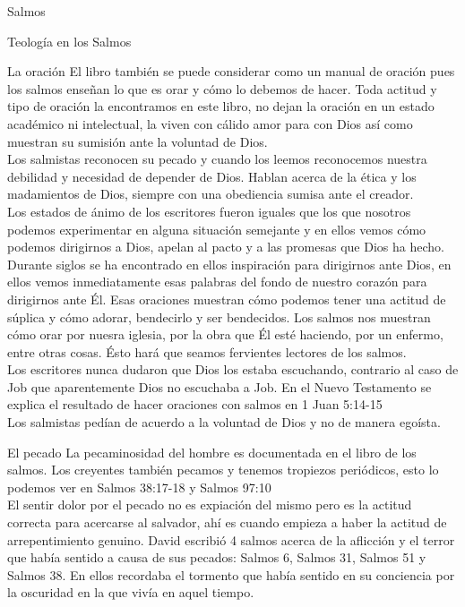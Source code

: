 \begin{section}{Salmos}
\begin{subsection}{Teología en los Salmos}
\begin{subsubsection}{La oración}
			El libro también se puede considerar como un manual de oración pues los salmos enseñan lo que es orar y cómo lo debemos de hacer. Toda actitud y tipo de oración la encontramos en este libro, no dejan la oración en un estado académico ni intelectual, la viven con cálido amor para con Dios así como muestran su sumisión ante la voluntad de Dios. \\
			Los salmistas reconocen su pecado y cuando los leemos reconocemos nuestra debilidad y necesidad de depender de Dios. Hablan acerca de la ética y los madamientos de Dios, siempre con una obediencia sumisa ante el creador.\\
			Los estados de ánimo de los escritores fueron iguales que los que nosotros podemos experimentar en alguna situación semejante y en ellos vemos cómo podemos dirigirnos a Dios, apelan al pacto y a las promesas que Dios ha hecho.\\
			Durante siglos se ha encontrado en ellos inspiración para dirigirnos ante Dios, en ellos vemos inmediatamente esas palabras del fondo de nuestro corazón para dirigirnos ante Él.
			\newpage
			Esas oraciones muestran cómo podemos tener una actitud de súplica y cómo adorar, bendecirlo y ser bendecidos. Los salmos nos muestran cómo orar por nuesra iglesia, por la obra que Él esté haciendo, por un enfermo, entre otras cosas. Ésto hará que seamos fervientes lectores de los salmos.\\
			Los escritores nunca dudaron que Dios los estaba escuchando, contrario al caso de Job que aparentemente Dios no escuchaba a Job. En el Nuevo Testamento se explica el resultado de hacer oraciones con salmos en  1 Juan 5:14-15\\
			Los salmistas pedían de acuerdo a la voluntad de Dios y no de manera egoísta.
		\end{subsubsection}
		\begin{subsubsection}{El pecado}
			La pecaminosidad del hombre es documentada en el libro de los salmos. Los creyentes también pecamos y tenemos tropiezos periódicos, esto lo podemos ver en Salmos 38:17-18 y Salmos 97:10\\
			El sentir dolor por el pecado no es expiación del mismo pero es la actitud correcta para acercarse al salvador, ahí es cuando empieza a haber la actitud de arrepentimiento genuino. David escribió 4 salmos acerca de la aflicción y el terror que había sentido a causa de sus pecados: Salmos 6, Salmos 31, Salmos 51 y Salmos 38. En ellos recordaba el tormento que había sentido en su conciencia por la oscuridad en la que vivía en aquel tiempo.\\

\end{subsubsection}
\end{subsection}
\end{section}
